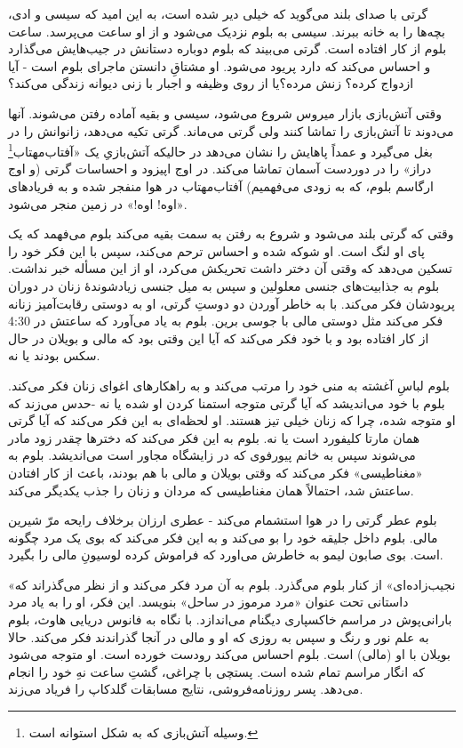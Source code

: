 \documentclass[12pt]{book}
\begin{document}
    گرتی با صدای بلند می‌گوید که خیلی دیر شده است، به این امید که سیسی و ادی، بچه‌ها را به خانه ببرند. سیسی به بلوم نزدیک می‌شود و از او ساعت می‌پرسد. ساعت بلوم از کار افتاده است. گرتی می‌بیند که بلوم دوباره دستانش در جیب‌هایش می‌گذارد و احساس می‌کند که دارد پریود می‌شود. او مشتاقِ دانستن ماجرای بلوم است - آیا ازدواج کرده؟ زنش مرده؟یا از روی وظیفه و اجبار با زنی دیوانه زندگی می‌کند؟

    وقتی آتش‌بازی بازار میروس شروع می‌شود، سیسی و بقیه آماده رفتن می‌شوند. آنها می‌دوند تا آتش‌بازی را تماشا کنند ولی گرتی می‌ماند. گرتی تکیه می‌دهد، زانوانش را در بغل می‌گیرد و عمداً پاهایش را نشان می‌دهد در حالیکه آتش‌بازیِ یک «آفتاب‌مهتاب\footnote{ وسیله آتش‌بازی که به شکل استوانه است.} دراز» را در دوردست آسمان تماشا می‌کند. در اوج اپیزود و احساسات گرتی (و اوج ارگاسم بلوم، که به زودی می‌فهمیم) آفتاب‌مهتاب در هوا منفجر شده و به فریادهای «اوه! اوه!» در زمین منجر می‌شود.

    وقتی که گرتی بلند می‌شود و شروع به رفتن به سمت بقیه می‌کند بلوم می‌فهمد که یک پای او لنگ است. او شوکه شده و احساس ترحم می‌کند، سپس با این فکر خود را تسکین می‌دهد که وقتی آن دختر داشت تحریکش می‌کرد، او از این مسأله خبر نداشت. بلوم به جذابیت‌های جنسی معلولین و سپس به میل جنسی زیادشوندۀ زنان در دوران پریودشان فکر می‌کند. با به خاطر آوردن دو دوستِ گرتی، او به دوستی رقابت‌آمیز زنانه فکر می‌کند مثل دوستی مالی با جوسی برین. بلوم به یاد می‌آورد که ساعتش در 4:30 از کار افتاده بود و با خود فکر می‌کند که آیا این وقتی بود که مالی و بویلان در حال سکس بودند یا نه.

    بلوم لباسِ آغشته به منی خود را مرتب می‌کند و به راهکارهای اغوای زنان فکر می‌کند. بلوم با خود می‌اندیشد که آیا گرتی متوجه استمنا کردن او شده یا نه -حدس می‌زند که او متوجه شده، چرا که زنان خیلی تیز هستند. او لحظه‌ای به این فکر می‌کند که آیا گرتی همان مارتا کلیفورد است یا نه. بلوم به این فکر می‌کند که دخترها چقدر زود مادر می‌شوند سپس به خانم پیورفوی که در زایشگاه مجاور است می‌اندیشد. بلوم به «مغناطیسی» فکر می‌کند که وقتی بویلان و مالی با هم بودند، باعث از کار افتادن ساعتش شد، احتمالاً همان مغناطیسی که مردان و زنان را جذب یکدیگر می‌کند.

    بلوم عطر گرتی را در هوا استشمام می‌کند - عطری ارزان برخلاف رایحه مرّ شیرین مالی. بلوم داخل جلیقه خود را بو می‌کند و به این فکر می‌کند که بوی یک مرد چگونه است. بوی صابون لیمو به خاطرش می‌اورد که فراموش کرده لوسیونِ مالی را بگیرد.

    «نجیب‌زاده‌ای» از کنار بلوم می‌گذرد. بلوم به آن مرد فکر می‌کند و از نظر می‌گذراند که داستانی تحت عنوان «مرد مرموز در ساحل» بنویسد. این فکر، او را به یاد مرد بارانی‌پوش در مراسم خاکسپاری دیگنام می‌اندازد. با نگاه به فانوس دریایی هاوث، بلوم به علم نور و رنگ و سپس به روزی که او و مالی در آنجا گذراندند فکر می‌کند. حالا بویلان با او (مالی) است. بلوم احساس می‌کند رودست خورده است. او متوجه می‌شود که انگار مراسم تمام شده است. پستچی با چراغی، گشتِ ساعت نهِ خود را انجام می‌دهد. پسر روزنامه‌فروشی، نتایج مسابقات گلدکاپ را فریاد می‌زند.
\end{document}
